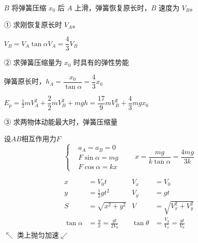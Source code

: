 \begin{problem}[{[3]}]
$B$ 将弹簧压缩 $x_0$ 后 $A$ 上滑，弹簧恢复原长时，$B$ 速度为 $V_B$。

\noindent ① 求刚恢复原长时 $V_A$。

\noindent $V_B=V_A\tan\alpha$\qquad $V_A=\dfrac43V_B$

\noindent ② 求弹簧压缩量为 $x_0$ 时具有的弹性势能

\noindent 弹簧原长时，$h_A=\dfrac{x_0}{\tan\alpha}=\dfrac43x_0$

\noindent $E_p=\tfrac12mV_A^{2}+\dfrac{2}{2}mV_B^{2}+mgh=\dfrac{17}{9}mV_B^{2}+\dfrac43mgx_0$

\noindent ③ 求两物体动能最大时，弹簧压缩量

\noindent 设$AB$相互作用力$F$
\[
\left\{\begin{aligned}
&a_A=a_B=0\\
&F\sin\alpha=mg\\
&F\cos\alpha=kx
\end{aligned}\right.\qquad x=\frac{mg}{k\tan\alpha}=\frac{4mg}{3k}
\]
\end{problem}
\begin{align*}
x&=V_0t & V_x&=V_0\\
y&=\tfrac12gt^2 & V_y&=gt\\
S&=\sqrt{x^2+y^2} & V&=\sqrt{V_x^2+V_y^2}\\
\tan\alpha&=\frac{y}{x}=\frac{gt}{2V_0} & \tan\theta&=\frac{V_y}{V_x}=\frac{gt}{V_0}
\end{align*}
\noindent $\nwarrow$ 类上抛\quad 匀加速$\swarrow$%

